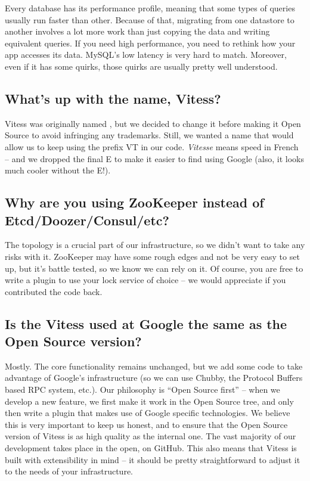 Every database has its performance profile, meaning that some types of
queries usually run faster than other. Because of that, migrating from
one datastore to another involves a lot more work than just copying
the data and writing equivalent queries. If you need high performance,
you need to rethink how your app accesses its data. MySQL’s low
latency is very hard to match. Moreover, even if it has some quirks,
those quirks are usually pretty well understood.

\subsection{What’s up with the name, Vitess?}\hypertarget{whats-up-with-the-name-vitess}{}\label{whats-up-with-the-name-vitess}

Vitess was originally named , but we decided to change it
before making it Open Source to avoid infringing any
trademarks. Still, we wanted a name that would allow us to keep using
the prefix VT in our code. \emph{Vitesse} means speed in French – and we
dropped the final E to make it easier to find using Google (also, it
looks much cooler without the E!).

\subsection{Why are you using ZooKeeper instead of Etcd/Doozer/Consul/etc?}\hypertarget{why-are-you-using-zookeeper-instead-of-etcddoozerconsuletc}{}\label{why-are-you-using-zookeeper-instead-of-etcddoozerconsuletc}

The topology is a crucial part of our infrastructure, so we didn’t
want to take any risks with it. ZooKeeper may have some rough edges
and not be very easy to set up, but it’s battle tested, so we know we
can rely on it. Of course, you are free to write a plugin to use your
lock service of choice – we would appreciate if you contributed the
code back.

\subsection{Is the Vitess used at Google the same as the Open Source version?}\hypertarget{is-the-vitess-used-at-google-the-same-as-the-open-source-version}{}\label{is-the-vitess-used-at-google-the-same-as-the-open-source-version}

Mostly. The core functionality remains unchanged, but we add some code
to take advantage of Google’s infrastructure (so we can use \cite{web:chubby} Chubby,
the Protocol Buffers based RPC system, etc.). Our philosophy is “Open
Source first” – when we develop a new feature, we first make it work
in the Open Source tree, and only then write a plugin that makes use
of Google specific technologies. We believe this is very important to
keep us honest, and to ensure that the Open Source version of Vitess
is as high quality as the internal one. The vast majority of our
development takes place in the open, on GitHub. This also means that
Vitess is built with extensibility in mind – it should be pretty
straightforward to adjust it to the needs of your infrastructure.

